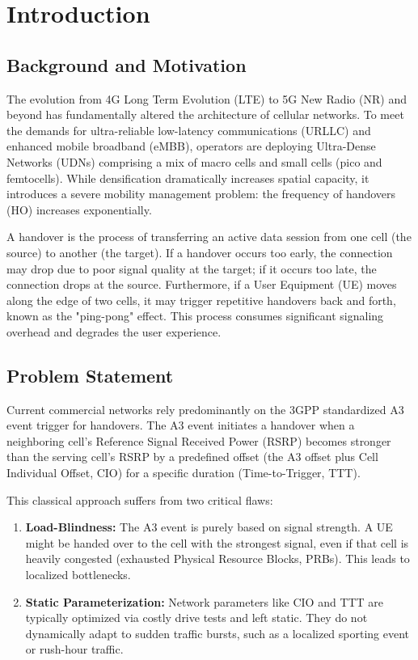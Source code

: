 \documentclass[12pt,a4paper,oneside]{report}
\begin{document}
\chapter{Introduction}
\label{ch:intro}

\section{Background and Motivation}
The evolution from 4G Long Term Evolution (LTE) to 5G New Radio (NR) and beyond has fundamentally altered the architecture of cellular networks. To meet the demands for ultra-reliable low-latency communications (URLLC) and enhanced mobile broadband (eMBB), operators are deploying Ultra-Dense Networks (UDNs) comprising a mix of macro cells and small cells (pico and femtocells). While densification dramatically increases spatial capacity, it introduces a severe mobility management problem: the frequency of handovers (HO) increases exponentially.

A handover is the process of transferring an active data session from one cell (the source) to another (the target). If a handover occurs too early, the connection may drop due to poor signal quality at the target; if it occurs too late, the connection drops at the source. Furthermore, if a User Equipment (UE) moves along the edge of two cells, it may trigger repetitive handovers back and forth, known as the "ping-pong" effect. This process consumes significant signaling overhead and degrades the user experience.

\section{Problem Statement}
Current commercial networks rely predominantly on the 3GPP standardized A3 event trigger for handovers. The A3 event initiates a handover when a neighboring cell's Reference Signal Received Power (RSRP) becomes stronger than the serving cell's RSRP by a predefined offset (the A3 offset plus Cell Individual Offset, CIO) for a specific duration (Time-to-Trigger, TTT).

This classical approach suffers from two critical flaws:
\begin{enumerate}
    \item \textbf{Load-Blindness:} The A3 event is purely based on signal strength. A UE might be handed over to the cell with the strongest signal, even if that cell is heavily congested (exhausted Physical Resource Blocks, PRBs). This leads to localized bottlenecks.
    \item \textbf{Static Parameterization:} Network parameters like CIO and TTT are typically optimized via costly drive tests and left static. They do not dynamically adapt to sudden traffic bursts, such as a localized sporting event or rush-hour traffic.
\end{enumerate}
\end{document}
